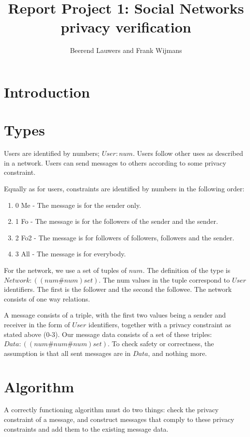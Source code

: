 \documentclass[10pt,a4paper]{article}
\author{Beerend Lauwers and Frank Wijmans}
\title{Report Project 1: Social Networks privacy verification}
\begin{document}
	
	\maketitle
	
	\section{Introduction}
	
	
	\section{Types}
	
	Users are identified by numbers; $ User : num $.
	Users follow other uses as described in a network.
	Users can send messages to others according to some privacy constraint.
	
	Equally as for users, constraints are identified by numbers in the following order:
	\begin{enumerate}
		\item 0 Me - The message is for the sender only.
		\item 1 Fo - The message is for the followers of the sender and the sender.
		\item 2 Fo2 - The message is for followers of followers, followers and the sender.
		\item 3 All - The message is for everybody.
	\end{enumerate}
		
	For the network, we use a set of tuples of $ num $. 
	The definition of the type is $ Network : ((num\#num) set) $.
	The num values in the tuple correspond to $ User $ identifiers. 
	The first is the follower and the second the followee. 
	The network consists of one way relations.


	A message consists of a triple, with the first two values being a sender and receiver in the form of $ User $  identifiers, together with a privacy constraint as stated above (0-3).
	Our message data consists of a set of these triples: $ Data : ((num\#num\#num) set) $.
	To check safety or correctness, the assumption is that all sent messages are in $ Data $, and nothing more.

	
	\section{Algorithm}
	
	A correctly functioning algorithm must do two things: check the privacy constraint of a message, and construct messages that comply to these privacy constraints and add them to the existing message data.
\end{document}
